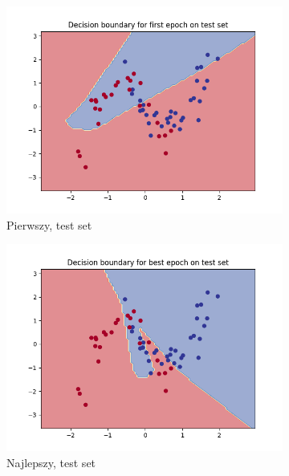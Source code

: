 \documentclass[12pt]{article}
\newcommand*{\subfigwidth}{0.24\textwidth}
\begin{document}
\begin{figure}[H]
\begin{subfigure}[t]{\subfigwidth}
        \includegraphics[width=\linewidth]{img/exp_4/set_0.2/first/test_boundary.png}
        \caption{Pierwszy, test set}
    \end{subfigure}
    \hfill
    \begin{subfigure}[t]{\subfigwidth}
        \includegraphics[width=\linewidth]{img/exp_4/set_0.2/best/test_boundary.png}
        \caption{Najlepszy, test set}
    \end{subfigure}
    \hfill
    \begin{subfigure}[t]{\subfigwidth}

\end{subfigure}
\end{figure}
\end{document}
